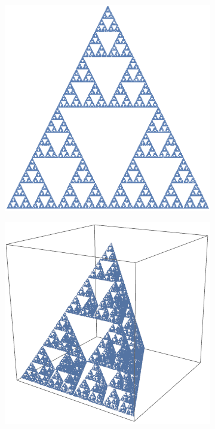 \documentclass[12pt]{amsart}
\numberwithin{equation}{section}
\begin{document}
\begin{figure}[h]
\centering
\begin{subfigure}{0.3\textwidth}
  \centering
  \includegraphics[width=0.85\linewidth]{sierp.png}
\end{subfigure}%
\begin{subfigure}{.3\textwidth}
  \centering
  \includegraphics[width=.9\linewidth]{sierptetra.png}
\end{subfigure}%
\begin{subfigure}{.3\textwidth}

\end{subfigure}
\end{figure}
\end{document}
